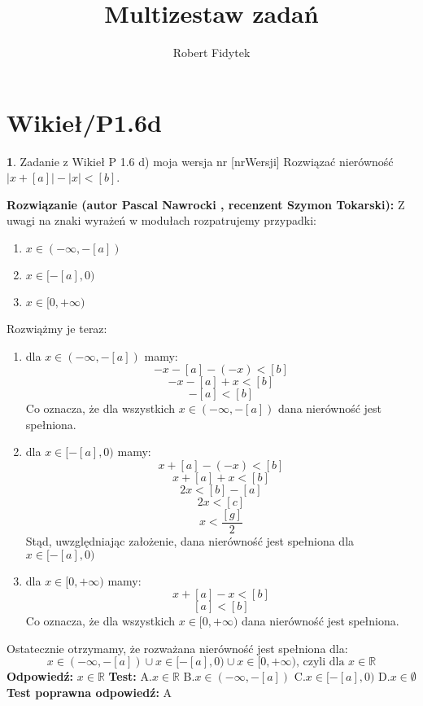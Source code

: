 \documentclass[12pt, a4paper]{article}
\title{Multizestaw zadań}
\author{Robert Fidytek}
\date{}
\theoremstyle{definition} %
\newtheorem{zad}{}
\newcommand{\kategoria}[1]{\section{#1}} %
\newcommand{\zadStart}[1]{\begin{zad}#1\newline} %
\newcommand{\zadStop}{\end{zad}}   %
\newcommand{\rozwStart}[2]{\noindent \textbf{Rozwiązanie (autor #1 , recenzent #2): }\newline} %
\newcommand{\rozwStop}{\newline}                                            %
\newcommand{\odpStart}{\noindent \textbf{Odpowiedź:}\newline}    %
\newcommand{\odpStop}{\newline}                                             %
\newcommand{\testStart}{\noindent \textbf{Test:}\newline} %
\newcommand{\testStop}{\newline} %
\newcommand{\kluczStart}{\noindent \textbf{Test poprawna odpowiedź:}\newline} %
\newcommand{\kluczStop}{\newline} %
\begin{document}
\maketitle


\kategoria{Wikieł/P1.6d}
\zadStart{Zadanie z Wikieł P 1.6 d) moja wersja nr [nrWersji]}
Rozwiązać nierówność $|x+[a]|-|x|<[b]$.
\zadStop
\rozwStart{Pascal Nawrocki}{Szymon Tokarski}
Z uwagi na znaki wyrażeń w modułach rozpatrujemy przypadki:
\begin{enumerate}
\item$x\in(-\infty,-[a])$
\item$x\in[-[a],0)$
\item$x\in[0,+\infty)$
\end{enumerate}
Rozwiążmy je teraz:
\begin{enumerate}
\item dla $x\in(-\infty,-[a])$
 mamy: 
$$ -x-[a]-(-x)<[b]$$
$$ -x-[a]+x<[b]$$
$$ -[a]<[b]$$
Co oznacza, że dla wszystkich $x\in(-\infty,-[a])$ dana nierówność jest spełniona.
\item dla $x\in[-[a],0)$
mamy:
$$x+[a]-(-x)<[b]$$
$$x+[a]+x<[b]$$
$$2x<[b]-[a]$$
$$2x<[c]$$
$$x<\frac{[g]}{2}$$
Stąd, uwzględniając założenie, dana nierówność jest spełniona dla $x\in[-[a],0)$
\item dla $x\in[0,+\infty)$
mamy:
$$x+[a]-x<[b]$$
$$[a]<[b]$$
Co oznacza, że dla wszystkich $x\in[0,+\infty)$ dana nierówność jest spełniona.
\end{enumerate}
Ostatecznie otrzymamy, że rozważana nierówność jest spełniona dla: 
$$x\in(-\infty,-[a])\cup x\in[-[a],0)\cup x\in[0,+\infty)  \text{, czyli dla } x\in \mathbb{R}$$
\rozwStop
\odpStart
$ x\in \mathbb{R}$
\odpStop
\testStart
A.$x\in \mathbb{R}$
B.$x\in(-\infty,-[a])$
C.$x\in[-[a],0)$
D.$x\in \emptyset$
\testStop
\kluczStart
A
\kluczStop
\end{document}
